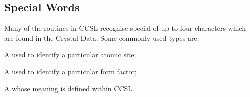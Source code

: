 \subsection{Special Words}
Many of the routines in CCSL recognise special \words of up to four characters
which are found in the Crystal Data. Some commonly used types are:\p
\begin{list} {} {\setlength{\labelwidth}{ 5cm}
  \setlength{\parsep}{-1ex}
  \setlength{\leftmargin}{\labelwidth}}
\item[\atlab \hfill] A \word used to identify a particular atomic site;
\item[\scat \hfill] A \word used to identify a particular form factor;
\item[\cw \hfill] A \word whose meaning is defined within CCSL.\end{list}
\p
